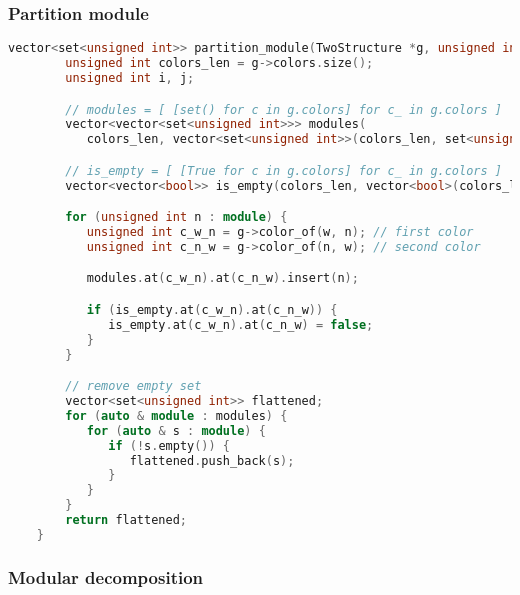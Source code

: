 \subsubsection{Partition module}

\begin{lstlisting}[language=C++, style=cpp, caption={Defining the Partition Module}, label={lst:cpp-define-partition-module}, firstnumber=1]
    vector<set<unsigned int>> partition_module(TwoStructure *g, unsigned int w, const set<unsigned int>& module) {
        unsigned int colors_len = g->colors.size();
        unsigned int i, j;

        // modules = [ [set() for c in g.colors] for c_ in g.colors ]
        vector<vector<set<unsigned int>>> modules(
           colors_len, vector<set<unsigned int>>(colors_len, set<unsigned int>()));

        // is_empty = [ [True for c in g.colors] for c_ in g.colors ]
        vector<vector<bool>> is_empty(colors_len, vector<bool>(colors_len, true));

        for (unsigned int n : module) {
           unsigned int c_w_n = g->color_of(w, n); // first color
           unsigned int c_n_w = g->color_of(n, w); // second color

           modules.at(c_w_n).at(c_n_w).insert(n);

           if (is_empty.at(c_w_n).at(c_n_w)) {
              is_empty.at(c_w_n).at(c_n_w) = false;
           }
        }

        // remove empty set
        vector<set<unsigned int>> flattened;
        for (auto & module : modules) {
           for (auto & s : module) {
              if (!s.empty()) {
                 flattened.push_back(s);
              }
           }
        }
        return flattened;
    }
\end{lstlisting}

\subsubsection{Modular decomposition}

